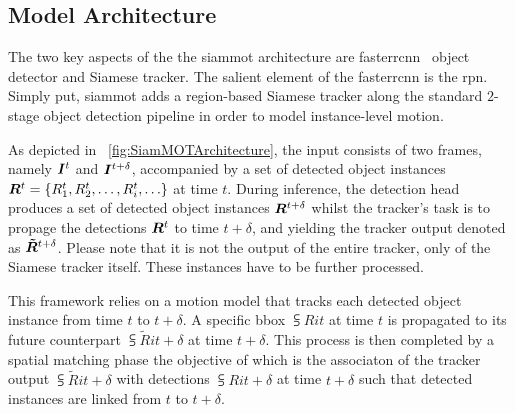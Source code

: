 \subsection{Model Architecture}

The two key aspects of the the \gls{siammot} architecture are \gls{fasterrcnn}~\cite{ren2017fasterrcnn} object detector and Siamese tracker. The salient element of the \gls{fasterrcnn} is the \gls{rpn}. Simply put, \gls{siammot} adds a region-based Siamese tracker along the standard $2$-stage object detection pipeline in order to model instance-level motion.

As depicted in \figtext{}~\ref{fig:SiamMOTArchitecture}, the input consists of two frames, namely $\bm{I}^{t}$ and $\bm{I}^{t + \delta}$, accompanied by a set of detected object instances $\bm{R}^{t} = \left\{ {{R}_{1}^{t}, {R}_{2}^{t}, \dots, {R}_{i}^{t}, \dots} \right\}$ at time $t$. During inference, the detection head produces a set of detected object instances $\bm{R}^{t + \delta}$ whilst the tracker's task is to propage the detections $\bm{R}^{t}$ to time $t + \delta$, and yielding the tracker output denoted as $\bm{\tilde{R}}^{t + \delta}$. Please note that it is not the output of the entire tracker, only of the Siamese tracker itself. These instances have to be further processed.

This framework relies on a motion model that tracks each detected object instance from time $t$ to $t + \delta$. A specific \gls{bbox} $\subsup{R}{i}{t}$ at time $t$ is propagated to its future counterpart $\subsup{\tilde{R}}{i}{t + \delta}$ at time $t + \delta$. This process is then completed by a spatial matching phase the objective of which is the associaton of the tracker output $\subsup{\tilde{R}}{i}{t + \delta}$ with detections $\subsup{R}{i}{t + \delta}$ at time $t + \delta$ such that detected instances are linked from $t$ to $t + \delta$.

